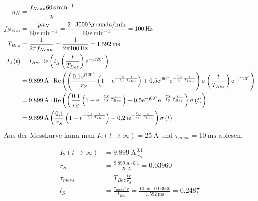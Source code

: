 \documentclass[11pt,a4paper]{scrartcl}
\newcommand{\mybr}[1]{\left(#1\right)}
\renewcommand{\j}{\mathrm{j}}
\renewcommand{\i}{\underline{i}}
\newcommand{\0}{_{\mybr{0}}}
\newcommand{\1}{_{\mybr{1}}}
\newcommand{\2}{_{\mybr{2}}}
\renewcommand{\e}{\mathrm{e}}
\renewcommand{\Re}{\mathrm{Re}}
\begin{document}
\section{}
\begin{align}
	n_N&=\frac{f_{Nenn}\SI{60}{\second\per\minute}}{p}\\
	f_{Nenn}&=\frac{p n_N}{\SI{60}{\second\per\minute}}=\frac{2\cdot\SI{3000}{\rounds\per\minute}}{\SI{60}{\second\per\minute}}=\SI{100}{\hertz}\\
	T_{Bez}&=\frac{1}{2\pi f_{Nenn}}=\frac{1}{2\pi\SI{100}{\hertz}}=\SI{1.592}{\milli\second}\\
	I_2\mybr{t}&=I_{Bez}\Re\mybr{\i_S\mybr{\frac{t}{T_{Bez}}}\e^{-\j\SI{120}{\degree}}}\\
	&=\SI{9.899}{\ampere}\cdot\Re\mybr{\mybr{\frac{\num{0.1}\e^{\j\SI{120}{\degree}}}{r_S}\mybr{1-\e^{-\frac{r_S}{l_S}\frac{t}{T_{Bez}}}}+\num{0.5}\e^{\j\SI{60}{\degree}}\e^{-\frac{r_S}{l_S}\frac{t}{T_{Bez}}}}\sigma\mybr{\frac{t}{T_{Bez}}}\e^{-\j\SI{120}{\degree}}}\\
	&=\SI{9.899}{\ampere}\cdot\Re\mybr{\mybr{\frac{\num{0.1}}{r_S}\mybr{1-\e^{-\frac{r_S}{l_S}\frac{t}{T_{Bez}}}}+\num{0.5}\e^{-\j\SI{60}{\degree}}\e^{-\frac{r_S}{l_S}\frac{t}{T_{Bez}}}}\sigma\mybr{t}}\\
	&=\SI{9.899}{\ampere}\mybr{\frac{\num{0.1}}{r_S}\mybr{1-\e^{-\frac{r_S}{l_S}\frac{t}{T_{Bez}}}}-\num{0.25}\e^{-\frac{r_S}{l_S}\frac{t}{T_{Bez}}}}\sigma\mybr{t}\\
\end{align}
Aus der Messkurve kann man $I_2\mybr{t\rightarrow\infty}=\SI{25}{\ampere}$ und $\tau_{mess}=\SI{10}{\milli\second}$ ablesen.
\begin{figure*}[!hp]
	\centering
\end{figure*}
\begin{align}
	I_2\mybr{t\rightarrow\infty}&=\SI{9.899}{\ampere}\frac{\num{0.1}}{r_S}\\
	r_S&=\frac{\SI{9.899}{\ampere}\cdot\num{0.1}}{\SI{25}{\ampere}}=\num{0.03960}\\
	\tau_{mess}&=T_{Bez}\frac{l_S}{r_S}\\
	l_S&=\frac{\tau_{mess}r_S}{T_{Bez}}=\frac{\SI{10}{\milli\second}\cdot\num{0.03960}}{\SI{1.592}{\milli\second}}=\num{0.2487}
\end{align}
\end{document}
